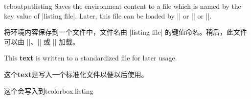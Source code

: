 
\begin{docEnvironment}{tcboutputlisting}{}
Saves the environment content to a file which is named by the key value of
|listing file|. Later, this file can be loaded by
|\tcbinputlisting| or |\tcbuselistingtext| or |\tcbuselistinglisting|.

将环境内容保存到一个文件中，文件名由 |listing file| 的键值命名。稍后，此文件可以由 |\tcbinputlisting|、|\tcbuselistingtext| 或 |\tcbuselistinglisting| 加载。
\begin{dispListing}
\begin{tcboutputlisting}
This \textbf{text} is written to a standardized file for later usage.

这个\textbf{text}是写入一个标准化文件以便以后使用。

这个会写入到tcolorbox.listing
\end{tcboutputlisting}
\end{dispListing}
\end{docEnvironment}


